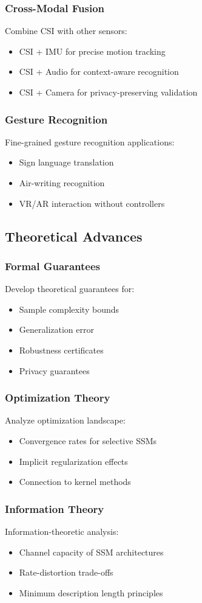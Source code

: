 \documentclass[journal]{IEEEtran}
\begin{document}
\subsubsection{Cross-Modal Fusion}
Combine CSI with other sensors:
\begin{itemize}
\item CSI + IMU for precise motion tracking
\item CSI + Audio for context-aware recognition
\item CSI + Camera for privacy-preserving validation
\end{itemize}

\subsubsection{Gesture Recognition}
Fine-grained gesture recognition applications:
\begin{itemize}
\item Sign language translation
\item Air-writing recognition
\item VR/AR interaction without controllers
\end{itemize}

\subsection{Theoretical Advances}

\subsubsection{Formal Guarantees}
Develop theoretical guarantees for:
\begin{itemize}
\item Sample complexity bounds
\item Generalization error
\item Robustness certificates
\item Privacy guarantees
\end{itemize}

\subsubsection{Optimization Theory}
Analyze optimization landscape:
\begin{itemize}
\item Convergence rates for selective SSMs
\item Implicit regularization effects
\item Connection to kernel methods
\end{itemize}

\subsubsection{Information Theory}
Information-theoretic analysis:
\begin{itemize}
\item Channel capacity of SSM architectures
\item Rate-distortion trade-offs
\item Minimum description length principles
\end{itemize}



\end{document}
